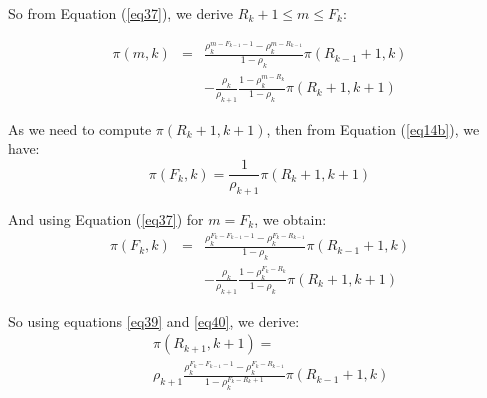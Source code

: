 \documentclass[conference]{IEEEtran}
\begin{document}
So from Equation (\ref{eq37}), we derive   $R_k+1 \leq m \leq F_k$:


\begin{eqnarray}
\pi(m,k)&=& \frac{ \rho_k ^{m-F_{k-1}-1 } -\rho_k^{m-R_{k-1}} } {1-\rho_k} \pi(R_{k-1}+1,k) \nonumber \\
 &&- \frac{\rho_k}{\rho_{k+1}} \frac{1- \rho_k ^{m-R_k}} {1-\rho_k} \pi(R_{k}+1, k+1)
 \label{eq38}
\end{eqnarray}


As we need to compute $\pi(R_{k}+1, k+1)$, then from Equation (\ref{eq14b}), we have:
\begin{equation}
\pi(F_{k},k)= \frac{1}{\rho_{k+1}} \pi(R_{k}+1,k+1)
\label{eq39}
\end{equation}


And using Equation (\ref{eq37}) for $m=F_k$, we obtain:
\begin{eqnarray}
\pi(F_k,k)&=& \frac{ \rho_k ^{F_k-F_{k-1}-1} -\rho_k^{F_k-R_{k-1}} } {1-\rho_k} \pi(R_{k-1}+1,k) \nonumber \\
&&- \frac{\rho_k}{\rho_{k+1}} \frac{1- \rho_k ^{F_k-R_k}} {1-\rho_k} \pi(R_{k}+1, k+1)
 \label{eq40}
\end{eqnarray}


So using equations \ref{eq39} and \ref{eq40}, we derive:
\begin{eqnarray}
&&\pi(R_{k+1},k+1)= \nonumber\\
&&\rho_{k+1} \frac{ \rho_k^{F_k-F_{k-1}-1}
-\rho_k^{F_k-R_{k-1}} } { 1- \rho_k^{F_k-R_{k}+1}} \pi(R_{k-1}+1,k)
\label{eq50}
\end{eqnarray}


\end{document}

